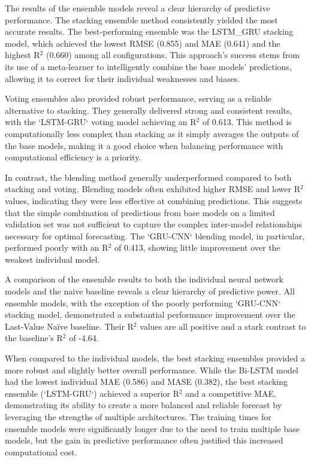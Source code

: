 The results of the ensemble models reveal a clear hierarchy of predictive performance. The stacking ensemble method consistently yielded the most accurate results. The best-performing ensemble was the LSTM\_GRU stacking model, which achieved the lowest RMSE (0.855) and MAE (0.641) and the highest R$^2$ (0.660) among all configurations. This approach's success stems from its use of a meta-learner to intelligently combine the base models' predictions, allowing it to correct for their individual weaknesses and biases.

Voting ensembles also provided robust performance, serving as a reliable alternative to stacking. They generally delivered strong and consistent results, with the `LSTM-GRU` voting model achieving an R$^2$ of 0.613. This method is computationally less complex than stacking as it simply averages the outputs of the base models, making it a good choice when balancing performance with computational efficiency is a priority.

In contrast, the blending method generally underperformed compared to both stacking and voting. Blending models often exhibited higher RMSE and lower R$^2$ values, indicating they were less effective at combining predictions. This suggests that the simple combination of predictions from base models on a limited validation set was not sufficient to capture the complex inter-model relationships necessary for optimal forecasting. The `GRU-CNN` blending model, in particular, performed poorly with an R$^2$ of 0.413, showing little improvement over the weakest individual model.

A comparison of the ensemble results to both the individual neural network models and the naive baseline reveals a clear hierarchy of predictive power. All ensemble models, with the exception of the poorly performing `GRU-CNN` stacking model, demonstrated a substantial performance improvement over the Last-Value Naïve baseline. Their R$^2$ values are all positive and a stark contrast to the baseline's R$^2$ of -4.64.

When compared to the individual models, the best stacking ensembles provided a more robust and slightly better overall performance. While the Bi-LSTM model had the lowest individual MAE (0.586) and MASE (0.382), the best stacking ensemble (`LSTM-GRU`) achieved a superior R$^2$ and a competitive MAE, demonstrating its ability to create a more balanced and reliable forecast by leveraging the strengths of multiple architectures. The training times for ensemble models were significantly longer due to the need to train multiple base models, but the gain in predictive performance often justified this increased computational cost.
